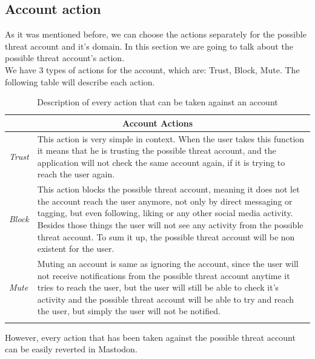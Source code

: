 \subsection{Account action}
As it was mentioned before, we can choose the actions separately for the possible threat account and it's
domain. In this section we are going to talk about the possible threat account's action.
\\[5pt]
We have 3 types of actions for the account, which are: Trust, Block, Mute.
The following table will describe each action.
\begin{center}
	\begin{longtable}{ | p{} | p{} | }
		
		\hline
		\multicolumn{2}{|c|}{\textbf{Account Actions}}
		\\ \hline
		

		\hline
		\endfirsthead %
		
		\hline
		\hline
		\endhead %
		
		\hline
		\endfoot %
		
		\endlastfoot %
		
		\emph{Trust}
		& This action is very simple in context. When the user takes this function it means
		that he is trusting the possible threat account, and the application will not check the same account again, if it is trying to reach the user again.
		\\ \hline
		
		\emph{Block}
		& This action blocks the possible threat account, meaning it does not let the account reach the user anymore, not only by direct messaging or tagging, but even following, liking or any other social media activity. Besides those things the user will not see any activity from the possible threat account. To sum it up, the possible threat account will be non existent for the user.
		\\ \hline
		
		\emph{Mute}
		& Muting an account is same as ignoring the account, since the user will not receive notifications from the possible threat account anytime it tries to reach the user, but the user will still be able to check it's activity and the possible threat account will be able to try and reach the user, but simply the user will not be notified.
		\\ \hline
		
		\caption{Description of every action that can be taken against an account}
		\label{tab:account_ac_d}		
	\end{longtable}
\end{center}
However, every action that has been taken against the possible threat account can be easily reverted in Mastodon.
